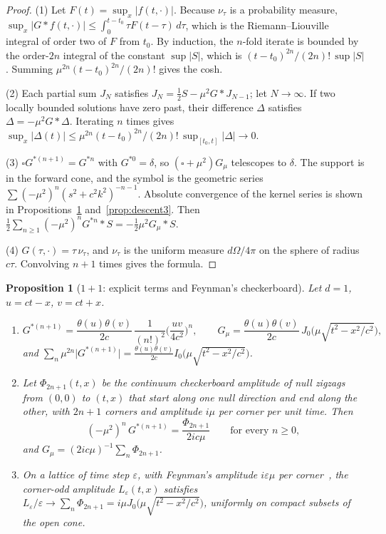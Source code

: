 \documentclass[11pt]{amsart}
\newtheorem{proposition}[theorem]{Proposition}
\theoremstyle{definition}
\theoremstyle{remark}
\newcommand{\eps}{\varepsilon}
\begin{document}
\begin{proof}
(1) Let $F(t)=\sup_x\lvert f(t,\cdot)\rvert$. Because $\nu_\tau$ is a probability measure, $\sup_x\lvert G*f(t,\cdot)\rvert\le\int_0^{t-t_0}\tau F(t-\tau)\,d\tau$, which is the Riemann--Liouville integral of order two of $F$ from $t_0$. By induction, the $n$-fold iterate is bounded by the order-$2n$ integral of the constant $\sup\lvert S\rvert$, which is $(t-t_0)^{2n}/(2n)!\,\sup\lvert S\rvert$. Summing $\mu^{2n}(t-t_0)^{2n}/(2n)!$ gives the cosh.

(2) Each partial sum $J_N$ satisfies $J_N=\tfrac12S-\mu^2G*J_{N-1}$; let $N\to\infty$. If two locally bounded solutions have zero past, their difference $\Delta$ satisfies $\Delta=-\mu^2G*\Delta$. Iterating $n$ times gives $\sup_x\lvert\Delta(t)\rvert\le\mu^{2n}(t-t_0)^{2n}/(2n)!\,\sup_{[t_0,t]}\lvert\Delta\rvert\to0$.

(3) $\square G^{*(n+1)}=G^{*n}$ with $G^{*0}=\delta$, so $(\square+\mu^2)G_\mu$ telescopes to $\delta$. The support is in the forward cone, and the symbol is the geometric series $\sum(-\mu^2)^n(s^2+c^2k^2)^{-n-1}$. Absolute convergence of the kernel series is shown in Propositions~\ref{prop:checker} and~\ref{prop:descent3}. Then $\tfrac12\sum_{n\ge1}(-\mu^2)^nG^{*n}*S=-\tfrac12\mu^2G_\mu*S$.

(4) $G(\tau,\cdot)=\tau\,\nu_\tau$, and $\nu_\tau$ is the uniform measure $d\Omega/4\pi$ on the sphere of radius $c\tau$. Convolving $n+1$ times gives the formula.
\end{proof}

\begin{proposition}[$1+1$: explicit terms and Feynman's checkerboard]\label{prop:checker}
Let $d=1$, $u=ct-x$, $v=ct+x$.
\begin{enumerate}
\item
\[
G^{*(n+1)}=\frac{\theta(u)\theta(v)}{2c}\,\frac1{(n!)^2}\Big(\frac{uv}{4c^2}\Big)^{n},\qquad
G_\mu=\frac{\theta(u)\theta(v)}{2c}\,J_0\Big(\mu\sqrt{t^2-x^2/c^2}\Big),
\]
and $\sum_n\mu^{2n}\lvert G^{*(n+1)}\rvert=\frac{\theta(u)\theta(v)}{2c}I_0\big(\mu\sqrt{t^2-x^2/c^2}\big)$.
\item Let $\Phi_{2n+1}(t,x)$ be the continuum checkerboard amplitude of null zigzags from $(0,0)$ to $(t,x)$ that start along one null direction and end along the other, with $2n+1$ corners and amplitude $i\mu$ per corner per unit time. Then
\[
(-\mu^2)^n\,G^{*(n+1)}=\frac{\Phi_{2n+1}}{2ic\mu}\qquad\text{for every }n\ge0,
\]
and $G_\mu=(2ic\mu)^{-1}\sum_n\Phi_{2n+1}$.
\item On a lattice of time step $\eps$, with Feynman's amplitude $i\eps\mu$ per corner~\cite{FH}, the corner-odd amplitude $L_\eps(t,x)$ satisfies $L_\eps/\eps\to\sum_n\Phi_{2n+1}=i\mu J_0\big(\mu\sqrt{t^2-x^2/c^2}\big)$, uniformly on compact subsets of the open cone.
\end{enumerate}
\end{proposition}
\end{document}
